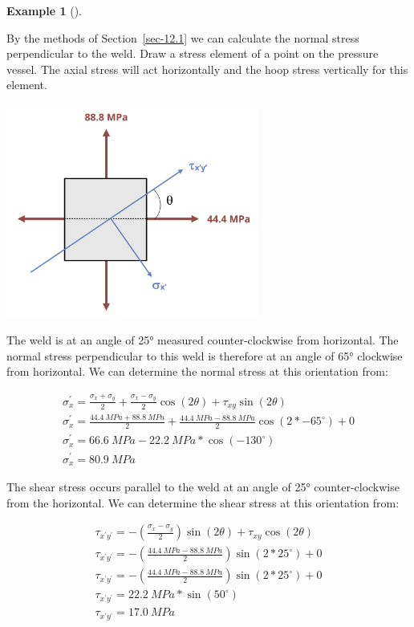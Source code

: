 \documentclass[
  letterpaper,
  DIV=11,
  numbers=noendperiod]{scrreprt}
\theoremstyle{definition}
\newtheorem{example}{Example}[chapter]
\theoremstyle{remark}
\begin{document}
\begin{tcolorbox}
\begin{example}[]
\begin{tcolorbox}
By the methods of Section~\ref{sec-12.1} we can calculate the normal
stress perpendicular to the weld. Draw a stress element of a point on
the pressure vessel. The axial stress will act horizontally and the hoop
stress vertically for this element.

\begin{center}
\includegraphics[width=3.26042in,height=\textheight]{images/CH13 PNGs/example 13.2 part 2.png}
\end{center}

The weld is at an angle of 25° measured counter-clockwise from
horizontal. The normal stress perpendicular to this weld is therefore at
an angle of 65° clockwise from horizontal. We can determine the normal
stress at this orientation from:

\[
\begin{gathered}
\sigma_x^{\prime}=\frac{\sigma_x+\sigma_y}{2}+\frac{\sigma_x-\sigma_y}{2} \cos (2 \theta)+\tau_{x y} \sin (2 \theta) \\
\sigma_x^{\prime}=\frac{44.4{~MPa}+88.8{~MPa}}{2}+\frac{44.4{~MPa}-88.8{~MPa}}{2} \cos \left(2 *-65^{\circ}\right)+0 \\
\sigma_x^{\prime}=66.6{~MPa}-22.2{~MPa}*\cos \left(-130^{\circ}\right) \\
\sigma_x^{\prime}=80.9{~MPa}
\end{gathered}
\]

The shear stress occurs parallel to the weld at an angle of 25°
counter-clockwise from the horizontal. We can determine the shear stress
at this orientation from:

\[
\begin{gathered}
\tau_{x^{\prime} y^{\prime}}=-\left(\frac{\sigma_x-\sigma_y}{2}\right) \sin (2 \theta)+\tau_{x y} \cos (2 \theta) \\
\tau_{x^{\prime} y^{\prime}}=-\left(\frac{44.4{~MPa}-88.8{~MPa}}{2}\right) \sin \left(2 * 25^{\circ}\right)+0 \\
\tau_{x^{\prime} y^{\prime}}=-\left(\frac{44.4{~MPa}-88.8{~MPa}}{2}\right) \sin \left(2 * 25^{\circ}\right)+0 \\
\tau_{x^{\prime} y^{\prime}}=22.2{~MPa}* \sin \left(50^{\circ}\right) \\
\tau_{x^{\prime} y^{\prime}}=17.0{~MPa}
\end{gathered}
\]


\end{tcolorbox}
\end{example}
\end{tcolorbox}
\end{document}
